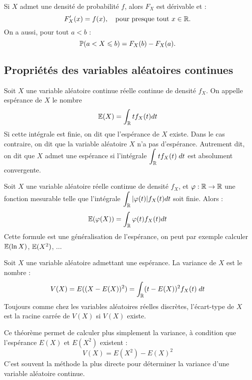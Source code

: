 \begin{proposition}
    Si $X$ admet une densité de probabilité $f$, alors $F_X$ est dérivable et :
        \[
            F_X'(x) = f(x), \quad \text{pour presque tout } x \in \mathbb{R}.
        \]
    On a aussi, pour tout $a < b$ :
        \[
            \mathbb{P}(a < X \leqslant b) = F_X(b) - F_X(a).
        \]
\end{proposition}

\subsection{Propriétés des variables aléatoires continues}

\begin{definition}[Espérance]
    Soit $X$ une variable aléatoire continue réelle continue de densité $f_X$.
    On appelle espérance de $X$ le nombre 
        \[ \mathbb{E}(X) = \int_{\mathbb{R}} t f_X(t) dt \]
    Si cette intégrale est finie, on dit que l'espérance de $X$ existe. Dans le cas contraire, 
    on dit que la variable aléatoire $X$ n'a pas d'espérance. 
    Autrement dit, on dit que $X$ admet une espérance si l'intégrale $\displaystyle \int_{\mathbb{R}} t f_X(t) \; dt$ 
    est absolument convergente. 
\end{definition}

\begin{theorem}
    Soit $X$ une variable aléatoire réelle continue de densité $f_X$, et $\varphi : \mathbb{R} \to \mathbb{R}$ une fonction mesurable telle que l’intégrale $\displaystyle \int_{\mathbb{R}} |\varphi(t)| f_X(t) dt$ soit finie. Alors :
        \[ \mathbb{E}(\varphi(X)) = \int_{\mathbb{R}} \varphi (t)f_X(t) dt\]
    Cette formule est une généralisation de l'espérance, on peut par exemple calculer $\mathbb{E}(\ln X)$, $\mathbb{E}(X^2)$, ...
\end{theorem}

\begin{definition}[Variance]
    Soit $X$ une variable aléatoire admettant une espérance. La variance de $X$ est le nombre :
        \[ V(X) = E((X - E(X))^2) = \int_{\mathbb{R}} (t - E(X))^2 f_X(t) \; dt \]
    Toujours comme chez les variables aléatoires réelles discrètes, l'écart-type de $X$ est la racine carrée de $V(X)$ si $V(X)$ existe.
\end{definition}

\begin{theorem}
    Ce théorème permet de calculer plus simplement la variance, à condition que l’espérance $E(X)$ et $E(X^2)$ existent :
        \[ V(X) = E(X^2) - E(X)^2 \]
    C’est souvent la méthode la plus directe pour déterminer la variance d’une variable aléatoire continue.
\end{theorem}


